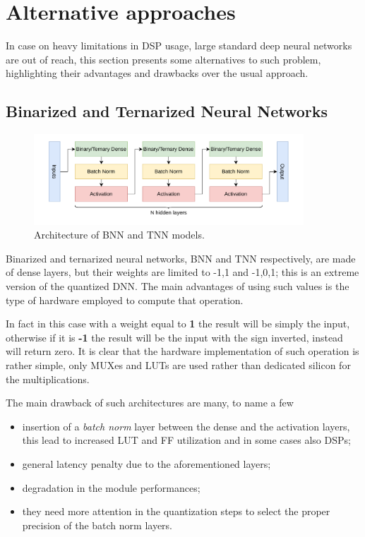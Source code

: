 \documentclass[../../main.tex]{subfiles}
\begin{document}
\section{Alternative approaches}
\label{sec:P2GT_Alt}
In case on heavy limitations in DSP usage, large standard deep neural networks are out of reach, this section presents some alternatives to such problem, highlighting their advantages and drawbacks over the usual approach. 
    
\subsection{Binarized and Ternarized  Neural Networks}
\label{sec:P2GT_BNN}

\begin{figure}[h]
    \centering
    \includegraphics[width=0.90\textwidth]{sections/05/Images/BNNs.pdf}
    \caption{Architecture of BNN and TNN models.}
    \label{fig:BTNN-arch}
\end{figure}

Binarized and ternarized neural networks, BNN and TNN respectively, are made of dense layers, but their weights are limited to {-1,1} and {-1,0,1}; this is an extreme version of the quantized DNN. The main advantages of using such values is the type of hardware employed to compute that operation.  

In fact in this case with a weight equal to \textbf{1} the result will be simply the input, otherwise if it is \textbf{-1} the result will be the input with the sign inverted, instead  will return zero. It is clear that the hardware implementation of such operation is rather simple, only MUXes and LUTs are used rather than dedicated silicon for the multiplications.  


The main drawback of such architectures are many, to name a few
\begin{itemize}
    \item insertion of a \textit{batch norm} layer between the dense and the activation layers, this lead to increased LUT and FF utilization and in some cases also DSPs;
    \item general latency penalty due to the aforementioned layers;
    \item degradation in the module performances;
    \item they need more attention in the quantization steps to select the proper precision of the batch norm layers.
\end{itemize}
  
\end{document}
